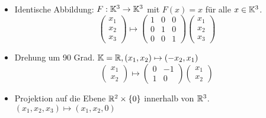 \begin{bsp}
\begin{center}
\end{center} 
\end{bsp} 

\begin{bsp}\
	\begin{itemize}
		\item  Identische Abbildung: $ F : \mathbb K^3 \to \mathbb K^3 $ mit $ F(x) = x $ für alle $ x \in \mathbb K^3 $.
		\begin{equation*}
			\begin{pmatrix} x_1 \\ x_2 \\ x_3 \end{pmatrix}  \mapsto \begin{pmatrix} 1 & 0 & 0 \\ 0 & 1 & 0 \\ 0 & 0 & 1 \end{pmatrix} \begin{pmatrix} x_1 \\ x_2 \\ x_3 \end{pmatrix}
		\end{equation*}
		\item Drehung um 90 Grad. $ \mathbb K = \mathbb R, (x_1,x_2) \mapsto (-x_2,x_1) $
		\begin{equation*}
			\left( \begin{matrix}
			x_1 \\ 
			x_2
			\end{matrix} \right)
			\mapsto
			\left( \begin{matrix}
			0 & -1 \\ 
			1 & 0
			\end{matrix} \right)
			\left( \begin{matrix}
			x_1 \\ 
			x_2
			\end{matrix} \right)
		\end{equation*}
		\item Projektion auf die Ebene $\mathbb R^2 \times \{0\}$ innerhalb von $\mathbb R^3$. $ (x_1,x_2,x_3) \mapsto (x_1,x_2,0) $
		\begin{equation*}

\end{equation*}
\end{itemize}
\end{bsp}
